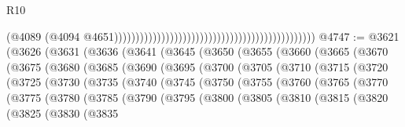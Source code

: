 \begin{lexlean}{R10}
\begin{coremodule}
                                                                                              (@4089
                                                                                                (@4094
                                                                                                  @4651)))))))))))))))))))))))))))))))))))))))))))))))
@4747 := @3621
    (@3626
      (@3631
        (@3636
          (@3641
            (@3645
              (@3650
                (@3655
                  (@3660
                    (@3665
                      (@3670
                        (@3675
                          (@3680
                            (@3685
                              (@3690
                                (@3695
                                  (@3700
                                    (@3705
                                      (@3710
                                        (@3715
                                          (@3720
                                            (@3725
                                              (@3730
                                                (@3735
                                                  (@3740
                                                    (@3745
                                                      (@3750
                                                        (@3755
                                                          (@3760
                                                            (@3765
                                                              (@3770
                                                                (@3775
                                                                  (@3780
                                                                    (@3785
                                                                      (@3790
                                                                        (@3795
                                                                          (@3800
                                                                            (@3805
                                                                              (@3810
                                                                                (@3815
                                                                                  (@3820
                                                                                    (@3825
                                                                                      (@3830
                                                                                        (@3835

\end{coremodule}
\end{lexlean}
